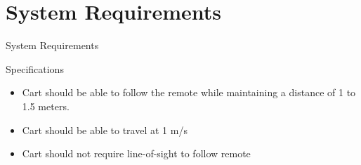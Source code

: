 \documentclass{beamer}
\begin{document}




\section{System Requirements}
\begin{frame}{System Requirements}
  \begin{block}{Specifications}
    \begin{itemize}
      \item Cart should be able to follow the remote while maintaining a distance of 1 to 1.5 meters.
      \item Cart should be able to travel at 1 m/s
      \item Cart should not require line-of-sight to follow remote
     \end{itemize}
  \end{block}
\end{frame}
\end{document}
